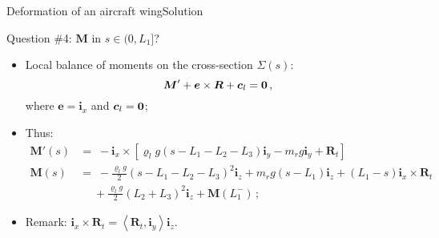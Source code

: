 \documentclass{beamer}
\newcommand{\cj}{c}
\newcommand{\cv}{{\boldsymbol\cj}}
\newcommand{\xj}{x}
\newcommand{\yj}{y}
\newcommand{\zj}{z}
\newcommand{\ej}{e}
\renewcommand{\ij}{i}
\newcommand{\ev}{{\boldsymbol\ej}}
\newcommand{\iv}{{\boldsymbol\ij}}
\newcommand{\roi}{\varrho}
\newcommand{\Fresj}{R}
\newcommand{\Mresj}{M}
\newcommand{\Fres}{{\boldsymbol\Fresj}}
\newcommand{\Mres}{{\boldsymbol\Mresj}}
\newcommand{\bzero}{{\bf 0}}
\newcommand{\scal}[1]{\left\langle{#1}\right\rangle}
\begin{document}
\begin{frame}{Deformation of an aircraft wing}{Solution}
\begin{overprint}
\vskip-20pt
\begin{exampleblock}{Question \#4: $\Mres$ in $s\in(0,L_1]$?}
\begin{itemize}
\item Local balance of moments on the cross-section $\Sigma(s)$:
\begin{displaymath}
\Mres'+\ev\times\Fres+\cv_l=\bzero\,,
\end{displaymath}
where $\ev=\iv_\xj$ and $\cv_l=\bzero$;
\item Thus:
\begin{displaymath}
\begin{split}
\!\!\!\!\Mres'(s) &= \scriptstyle\; -\iv_\xj\times[\roi_l g(s-L_1-L_2-L_3)\iv_\yj-m_r g\iv_\yj+\Fres_t] \\
\!\!\!\!\Mres(s) &= \scriptstyle\; -\frac{\roi_l g}{2}(s-L_1-L_2-L_3)^2\iv_\zj + m_r g(s-L_1)\iv_\zj +(L_1-s)\iv_\xj\times\Fres_t \\
& \scriptstyle\;\quad+\frac{\roi_l g}{2}(L_2+L_3)^2\iv_\zj +\Mres(L_1^-)\,;
\end{split}
\end{displaymath}
\item Remark: $\iv_\xj\times\Fres_t=\scal{\Fres_t,\iv_\yj}\iv_\zj$.
\end{itemize}
\end{exampleblock}


\end{overprint}
\end{frame}
\end{document}
